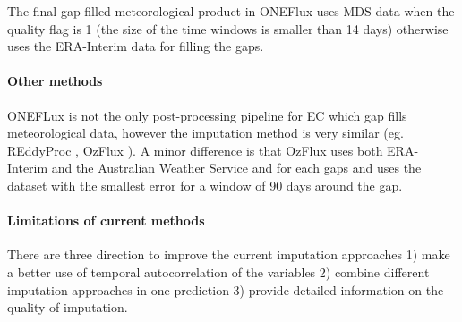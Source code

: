 \documentclass{article}
\let\Oldsubsection\subsection
\renewcommand{\subsection}{\FloatBarrier\Oldsubsection}
\begin{document}
The final gap-filled meteorological product in ONEFlux uses MDS data when the quality flag is 1 (the size of the time windows is smaller than 14 days) otherwise uses the ERA-Interim data for filling the gaps.

\paragraph{Other methods} ONEFLux is not the only post-processing pipeline for EC which gap fills meteorological data, however the imputation method is very similar (eg. REddyProc \cite{wutzler_basic_2018}, OzFlux \cite{isaac_ozflux_2017}). A minor difference is that OzFlux uses both ERA-Interim and  the Australian Weather Service and for each gaps and uses the dataset with the smallest error for a window of 90 days around the gap.


\paragraph{Limitations of current methods} There are three direction to improve the current imputation approaches  1) make a better use of temporal autocorrelation of the variables 2) combine different imputation approaches in one prediction  3) provide detailed information on the quality of imputation.
\end{document}
